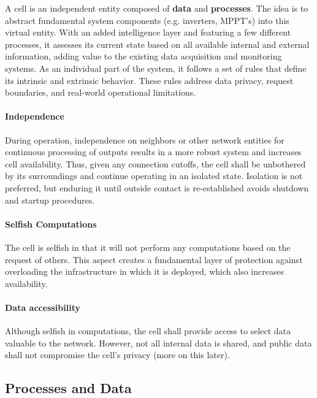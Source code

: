 A cell is an independent entity composed of \textbf{data} and \textbf{processes}. The idea is to abstract fundamental system components (e.g. inverters, MPPT's) into this virtual entity. With an added intelligence layer and featuring a few different processes, it assesses its current state based on all available internal and external information, adding value to the existing data acquisition and monitoring systems. As an individual part of the system, it follows a set of rules that define its intrinsic and extrinsic behavior. These rules address data privacy, request boundaries, and real-world operational limitations.

\paragraph*{Independence} During operation, independence on neighbors or other network entities for continuous processing of outputs results in a more robust system and increases cell availability. Thus, given any connection cutoffs, the cell shall be unbothered by its surroundings and continue operating in an isolated state. Isolation is not preferred, but enduring it until outside contact is re-established avoids shutdown and startup procedures.

\paragraph*{Selfish Computations} The cell is selfish in that it will not perform any computations based on the request of others. This aspect creates a fundamental layer of protection against overloading the infrastructure in which it is deployed, which also increases availability.

\paragraph*{Data accessibility} Although selfish in computations, the cell shall provide access to select data valuable to the network. However, not all internal data is shared, and public data shall not compromise the cell's privacy (more on this later).

\subsection{Processes and Data}


